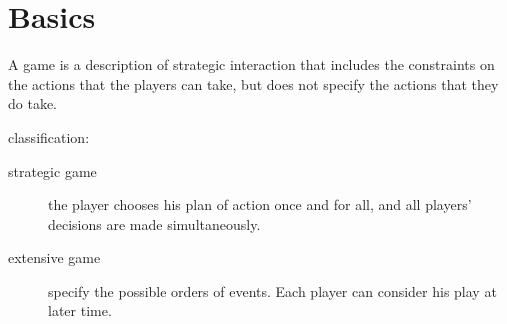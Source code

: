 \section{Basics}

A game is a description of strategic interaction that includes the constraints on the actions that the players can take, but does not specify the actions that they do take.

classification:
\begin{description}
    \item [strategic game] the player chooses his plan of action once and for all, and all players' decisions are made simultaneously.
    \item [extensive game] specify the possible orders of events. Each player can consider his play at later time.
\end{description}

